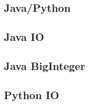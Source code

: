 \documentclass[10pt]{article}
\begin{document}
\begin{multicols*}{3}
    \section{Java/Python}
    \subsection{Java IO}
    \subsection{Java BigInteger}
    \subsection{Python IO}

\end{multicols*}
\end{document}
